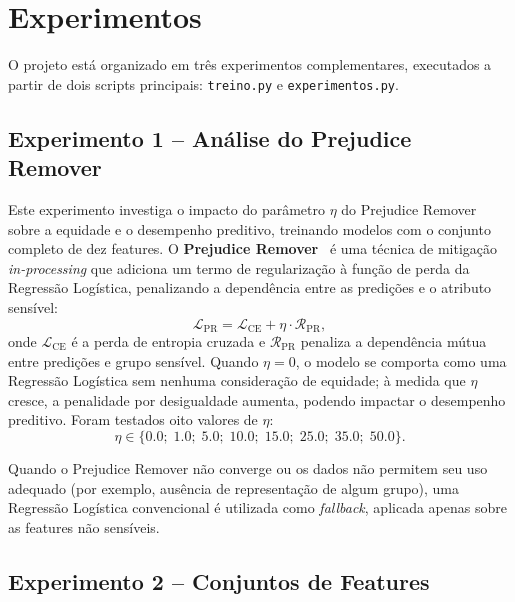 \section{Experimentos}
\label{sec:experimentos}

O projeto está organizado em três experimentos complementares, executados a partir de dois scripts principais: \texttt{treino.py} e \texttt{experimentos.py}.

\subsection{Experimento 1 -- Análise do Prejudice Remover}

Este experimento investiga o impacto do parâmetro $\eta$ do Prejudice Remover sobre a equidade e o desempenho preditivo, treinando modelos com o conjunto completo de dez features. O \textbf{Prejudice Remover}~\cite{kamishima2012fairness} é uma técnica de mitigação \textit{in-processing} que adiciona um termo de regularização à função de perda da Regressão Logística, penalizando a dependência entre as predições e o atributo sensível:
\[
\mathcal{L}_{\text{PR}} = \mathcal{L}_{\text{CE}} + \eta \cdot \mathcal{R}_{\text{PR}},
\]
onde $\mathcal{L}_{\text{CE}}$ é a perda de entropia cruzada e $\mathcal{R}_{\text{PR}}$ penaliza a dependência mútua entre predições e grupo sensível. Quando $\eta = 0$, o modelo se comporta como uma Regressão Logística sem nenhuma consideração de equidade; à medida que $\eta$ cresce, a penalidade por desigualdade aumenta, podendo impactar o desempenho preditivo. Foram testados oito valores de $\eta$:
\[
\eta \in \{0.0;\; 1.0;\; 5.0;\; 10.0;\; 15.0;\; 25.0;\; 35.0;\; 50.0\}.
\]

Quando o Prejudice Remover não converge ou os dados não permitem seu uso adequado (por exemplo, ausência de representação de algum grupo), uma Regressão Logística convencional é utilizada como \textit{fallback}, aplicada apenas sobre as features não sensíveis.

\subsection{Experimento 2 -- Conjuntos de Features}

